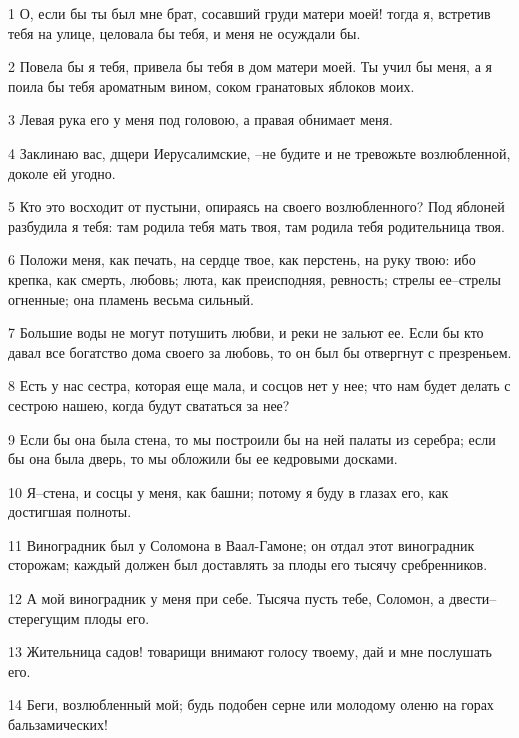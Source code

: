 \par 1 О, если бы ты был мне брат, сосавший груди матери моей! тогда я, встретив тебя на улице, целовала бы тебя, и меня не осуждали бы.
\par 2 Повела бы я тебя, привела бы тебя в дом матери моей. Ты учил бы меня, а я поила бы тебя ароматным вином, соком гранатовых яблоков моих.
\par 3 Левая рука его у меня под головою, а правая обнимает меня.
\par 4 Заклинаю вас, дщери Иерусалимские, --не будите и не тревожьте возлюбленной, доколе ей угодно.
\par 5 Кто это восходит от пустыни, опираясь на своего возлюбленного? Под яблоней разбудила я тебя: там родила тебя мать твоя, там родила тебя родительница твоя.
\par 6 Положи меня, как печать, на сердце твое, как перстень, на руку твою: ибо крепка, как смерть, любовь; люта, как преисподняя, ревность; стрелы ее--стрелы огненные; она пламень весьма сильный.
\par 7 Большие воды не могут потушить любви, и реки не зальют ее. Если бы кто давал все богатство дома своего за любовь, то он был бы отвергнут с презреньем.
\par 8 Есть у нас сестра, которая еще мала, и сосцов нет у нее; что нам будет делать с сестрою нашею, когда будут свататься за нее?
\par 9 Если бы она была стена, то мы построили бы на ней палаты из серебра; если бы она была дверь, то мы обложили бы ее кедровыми досками.
\par 10 Я--стена, и сосцы у меня, как башни; потому я буду в глазах его, как достигшая полноты.
\par 11 Виноградник был у Соломона в Ваал-Гамоне; он отдал этот виноградник сторожам; каждый должен был доставлять за плоды его тысячу сребренников.
\par 12 А мой виноградник у меня при себе. Тысяча пусть тебе, Соломон, а двести--стерегущим плоды его.
\par 13 Жительница садов! товарищи внимают голосу твоему, дай и мне послушать его.
\par 14 Беги, возлюбленный мой; будь подобен серне или молодому оленю на горах бальзамических!


